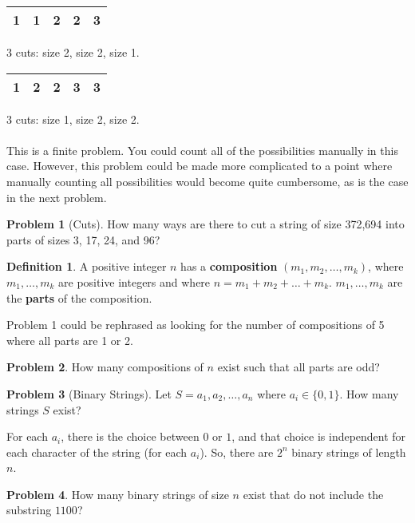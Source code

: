 \documentclass[]{article}
\theoremstyle{definition}
\newtheorem{problem}{Problem}[section]
\newtheorem{defn}{Definition}[section]
\begin{document}
			\begin{tabular}{|c|c|c|c|c|}
				\hline
				1 & 1 & 2 & 2 & 3 \\
				\hline
			\end{tabular}
			3 cuts: size 2, size 2, size 1.
		
			\begin{tabular}{|c|c|c|c|c|}
				\hline
				1 & 2 & 2 & 3 & 3 \\
				\hline
			\end{tabular}
			3 cuts: size 1, size 2, size 2.
			\\ \\
			This is a finite problem. You could count all of the possibilities manually in this case. However, this problem could be made more complicated to a point where manually counting all possibilities would become quite cumbersome, as is the case in the next problem.
		
			\begin{problem}[Cuts]
				How many ways are there to cut a string of size 372,694 into parts of sizes 3, 17, 24, and 96?
			\end{problem}
		
			\begin{defn}
				A positive integer $n$ has a \textbf{composition} $(m_1, m_2, \ldots, m_k)$, where $m_1, \ldots, m_k$ are positive integers and where $n = m_1 + m_2 + \ldots + m_k$. $m_1, \ldots, m_k$ are the \textbf{parts} of the composition.
			\end{defn}
		
			Problem 1 could be rephrased as looking for the number of compositions of 5 where all parts are 1 or 2.
		
			\begin{problem}
				How many compositions of $n$ exist such that all parts are odd?
			\end{problem}
		
			\begin{problem}[Binary Strings]
				Let $S = a_1, a_2, \ldots, a_n$ where $a_i \in \{0, 1\}$. How many strings $S$ exist?
			\end{problem}
		
			For each $a_i$, there is the choice between $0$ or $1$, and that choice is independent for each character of the string (for each $a_i$). So, there are $2^n$ binary strings of length $n$.
		
			\begin{problem}
				How many binary strings of size $n$ exist that do not include the substring $1100$?
			\end{problem}
		
\end{document}
